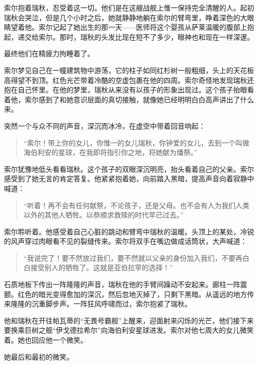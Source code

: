 \documentclass[AutoFakeBold=true]{book}
\begin{document}
索尔抱着瑞秋，忍受着这一切。他们是在这艘战舰上惟一保持完全清醒的人。起初瑞秋会哭泣，但是几个小时之后，她就静静地躺在索尔的臂弯里，睁着深色的大眼睛望着他。索尔记起了她出生的那一天——医师将这个婴孩从萨莱温暖的腹部上抱起，递交给索尔。那时，瑞秋的头发比现在短不了多少，眼神也和现在一样深邃。

最终他们在精疲力拘睡着了。

索尔梦见自己在一幢建筑物中游荡，它的柱子如同红杉树一般粗细，头上的天花板高得望不到顶。红色光芒带着冷酷的空虚包裹在他的四周。索尔奇怪地发现瑞秋还抱在自己怀里。在他的梦里，瑞秋从来没有以孩子的形象出现过。这个孩子抬眼看着他，索尔感到了和她意识层面的真切接触，就像她已经明明白白高声讲出了什么来。

突然一个与众不同的声音，深沉而冰冷，在虚空中带着回音响起：

\begin{quotation}
	{\kaishu ``索尔！带上你的女儿，你惟一的女儿瑞秋，你钟爱的女儿，去到一个叫做海伯利安的星球，在我即将指引你之地，将她献为燔祭。''}
\end{quotation}

索尔犹豫地低头看看瑞秋。这个孩子的双眼深沉明亮，抬头看着自己的父亲。索尔感受到了她无言的肯定答复。他紧紧抱着她，向前踏入黑暗，提高声音向着寂静中喊道：

\begin{quotation}
	{\kaishu ``听着！再不会有任何献祭，不论孩子，还是父母。也不会有人为我们人类以外的其他人牺牲。以恭顺求救赎的时代早已过去。''}
\end{quotation}

索尔聆听着。他感受着自己心脏的跳动和臂弯中瑞秋的温暖。头顶上的某处，冷锐的风声穿过肉眼看不见的裂缝传来。索尔将双手在嘴边做成话筒状，大声喊道：

\begin{quotation}
	{\kaishu ``我说完了！要不然放过我们，要不然就以父亲的身份加入我们，不要再白白接受别人的牺牲了。这就是亚伯拉罕的选择！''}
\end{quotation}

石质地板下传出一阵隆隆的声音，瑞秋在他的手臂间躁动不安起来。廊柱一阵震颤。红色的暗光变得愈加的深沉，然后忽地灭掉了，只剩下黑暗。从遥远的地方传来隆隆的沉重脚步声。一阵狂风呼啸而过，索尔抱紧了瑞秋。

他和瑞秋在开往帕瓦蒂的``无畏号霸舰''上醒来，迎面射来闪烁的光芒，他们接下来要换乘巨树之舰``伊戈德拉希尔''向海伯利安星球进发。索尔对他七周大的女儿微笑着。她也回应他一个微笑。

她最后和最初的微笑。

\vspace*{1em}
\end{document}
